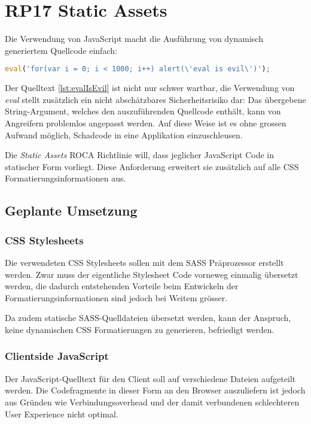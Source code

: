 \section{RP17 Static Assets}
\label{sec:principle-rp17-static-assets}

Die Verwendung von JavaScript macht die Ausführung von dynamisch generiertem Quellcode einfach:

\begin{lstlisting}[language=JavaScript, caption={Ausführung von dynamischem Quelltext mittels \emph{eval}}, label={lst:evalIsEvil}]
eval('for(var i = 0; i < 1000; i++) alert(\'eval is evil\')');
\end{lstlisting}

Der Quelltext \ref{lst:evalIsEvil} ist nicht nur schwer wartbar, die Verwendung von \emph{eval} \cite{mdnEval} stellt zusätzlich ein nicht abschätzbares Sicherheitsrisiko dar: Das übergebene String-Argument, welches den auszuführenden Quellcode enthält, kann von Angreifern problemlos angepasst werden. Auf diese Weise ist es ohne grossen Aufwand möglich, Schadcode in eine Applikation einzuschleusen.

Die \emph{Static Assets} ROCA Richtlinie will, dass jeglicher JavaScript Code in statischer Form vorliegt. Diese Anforderung erweitert sie zusätzlich auf alle CSS Formatierungsinformationen aus.

\subsection*{Geplante Umsetzung}
\subsubsection*{CSS Stylesheets}
Die verwendeten CSS Stylesheets sollen mit dem SASS Präprozessor \cite{SASS} erstellt werden. Zwar muss der eigentliche Stylesheet Code vorneweg einmalig übersetzt werden, die dadurch entstehenden Vorteile beim Entwickeln der Formatierungsinformationen sind jedoch bei Weitem grösser.

Da zudem statische SASS-Quelldateien übersetzt werden, kann der Anspruch, keine dynamischen CSS Formatierungen zu generieren, befriedigt werden.

\subsubsection*{Clientside JavaScript}
Der JavaScript-Quelltext für den Client soll auf verschiedene Dateien aufgeteilt werden. Die Codefragmente in dieser Form an den Browser auszuliefern ist jedoch aus Gründen wie Verbindungsoverhead und der damit verbundenen schlechteren User Experience nicht optimal.

